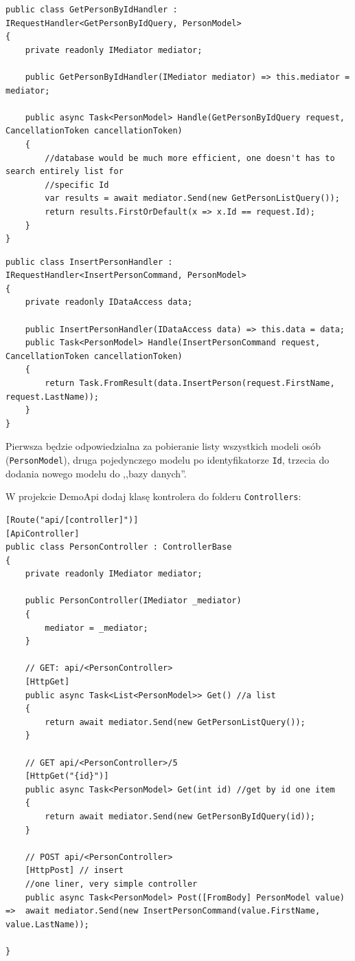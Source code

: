 \begin{lstlisting}
public class GetPersonByIdHandler : IRequestHandler<GetPersonByIdQuery, PersonModel>
{
	private readonly IMediator mediator;
	
	public GetPersonByIdHandler(IMediator mediator) => this.mediator = mediator;
	
	public async Task<PersonModel> Handle(GetPersonByIdQuery request, CancellationToken cancellationToken)
	{
		//database would be much more efficient, one doesn't has to search entirely list for 
		//specific Id
		var results = await mediator.Send(new GetPersonListQuery());
		return results.FirstOrDefault(x => x.Id == request.Id);
	}
}
\end{lstlisting}

\begin{lstlisting}
public class InsertPersonHandler : IRequestHandler<InsertPersonCommand, PersonModel>
{
	private readonly IDataAccess data;
	
	public InsertPersonHandler(IDataAccess data) => this.data = data;
	public Task<PersonModel> Handle(InsertPersonCommand request, CancellationToken cancellationToken)
	{
		return Task.FromResult(data.InsertPerson(request.FirstName, request.LastName));
	}
}
\end{lstlisting}
Pierwsza będzie odpowiedzialna za pobieranie listy wszystkich modeli osób (\texttt{PersonModel}), druga pojedynczego modelu po identyfikatorze \texttt{Id}, trzecia do dodania nowego modelu do ,,bazy danych''.


W projekcie DemoApi dodaj klasę kontrolera do folderu \texttt{Controllers}:
\begin{lstlisting}
[Route("api/[controller]")]
[ApiController]
public class PersonController : ControllerBase
{
	private readonly IMediator mediator;
	
	public PersonController(IMediator _mediator)
	{
		mediator = _mediator;
	}
	
	// GET: api/<PersonController>
	[HttpGet]
	public async Task<List<PersonModel>> Get() //a list
	{
		return await mediator.Send(new GetPersonListQuery());
	}
	
	// GET api/<PersonController>/5
	[HttpGet("{id}")]
	public async Task<PersonModel> Get(int id) //get by id one item
	{
		return await mediator.Send(new GetPersonByIdQuery(id));
	}
	
	// POST api/<PersonController>
	[HttpPost] // insert
	//one liner, very simple controller
	public async Task<PersonModel> Post([FromBody] PersonModel value) =>  await mediator.Send(new InsertPersonCommand(value.FirstName, value.LastName));
	
}
\end{lstlisting}

